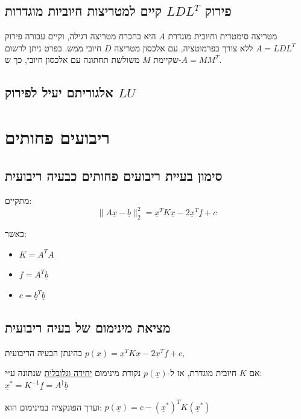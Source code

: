 \documentclass[11pt]{article}
\begin{document}
\subsection{פירוק \(LDL^{T}\) קיים למטריצות חיוביות מוגדרות}
\label{sec:org1aba0a5}
מטריצה סימטרית וחיובית מוגדרת \(A\) היא בהכרח מטריצה רגילה,
וקיים עבורה פירוק \(A=LDL^T\) ללא צורך בפרמוטציה, עם אלכסון מטריצה \(D\) חיובי ממש.
בפרט ניתן לרשום שקיימת \(M\) משולשת תחתונה עם אלכסון חיובי, כך ש-\(A = MM^T\).


\subsection{אלגוריתם יעיל לפירוק \(LU\)}
\label{sec:orgb37cd03}


\section{ריבועים פחותים}
\label{sec:orgc7da0de}

\subsection{סימון בעיית ריבועים פחותים כבעיה ריבועית}
\label{sec:org23d1d11}
מתקיים:
\[
\|A\underline{x} - \underline{b}\|_2^2
=
\underline{x}^TK\underline{x} - 2\underline{x}^T\underline{f}+c
\]

כאשר:
\begin{itemize}
\item \(K = A^TA\)
\item \(\underline{f} = A^T\underline{b}\)
\item \(c=\underline{b}^T\underline{b}\)
\end{itemize}

\subsection{מציאת מינימום של בעיה ריבועית}
\label{sec:org01cb1ce}

בהינתן הבעיה הריבועית \(p \left( \underline{x} \right) = \underline{x}^TK\underline{x} - 2\underline{x}^T\underline{f} + c\),

אם \(K\) חיובית מוגדרת, אז ל-\(p \left( \underline{x} \right)\) נקודת מינימום \uline{יחידה וגלובלית} שנתונה ע״י: \(\underline{x}^{*}=K^{-1}\underline{f} = A^{\dagger} \underline{b}\)

וערך הפונקציה במינימום הוא: \(p \left( \underline{x} \right) = c - \left( \underline{x}^* \right)^TK \left( \underline{x}^{*} \right)\)
\end{document}
